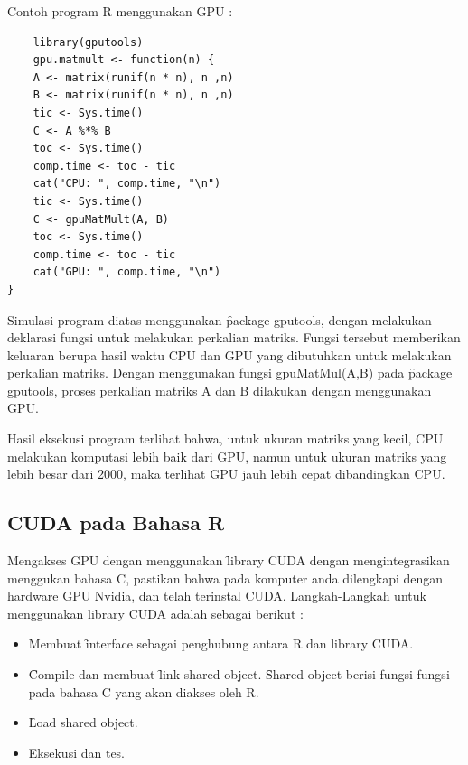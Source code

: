 Contoh program R menggunakan GPU :

\begin{lstlisting}
	library(gputools)
	gpu.matmult <- function(n) {
    A <- matrix(runif(n * n), n ,n)
    B <- matrix(runif(n * n), n ,n)
    tic <- Sys.time()
    C <- A %*% B
    toc <- Sys.time()
    comp.time <- toc - tic
    cat("CPU: ", comp.time, "\n")
    tic <- Sys.time()
    C <- gpuMatMult(A, B)
    toc <- Sys.time()
    comp.time <- toc - tic
    cat("GPU: ", comp.time, "\n")
}
\end{lstlisting}

Simulasi program diatas menggunakan \f{package} gputools, dengan melakukan deklarasi fungsi untuk melakukan perkalian matriks. Fungsi tersebut memberikan keluaran berupa hasil waktu CPU dan GPU yang dibutuhkan untuk melakukan perkalian matriks. Dengan menggunakan fungsi gpuMatMul(A,B) pada \f{package} gputools, proses perkalian matriks A dan B dilakukan dengan menggunakan GPU.

Hasil eksekusi program terlihat bahwa, untuk ukuran matriks yang kecil, CPU melakukan komputasi  lebih baik dari GPU, namun untuk ukuran matriks yang lebih besar dari 2000, maka terlihat GPU jauh lebih cepat dibandingkan CPU.

\subsection{CUDA pada Bahasa R}

Mengakses GPU dengan menggunakan \f{library} CUDA dengan mengintegrasikan menggukan bahasa C, pastikan bahwa pada komputer anda dilengkapi dengan hardware GPU Nvidia, dan telah terinstal CUDA. Langkah-Langkah untuk menggunakan library CUDA adalah sebagai berikut :

\begin{itemize}
\item Membuat \f{interface} sebagai penghubung antara R dan library CUDA.
\item \f{Compile} dan membuat \f{link shared object}. \f{Shared object} berisi fungsi-fungsi pada bahasa C yang akan diakses oleh R.
\item \f{Load shared object}.
\item Eksekusi dan tes.
\end{itemize}

